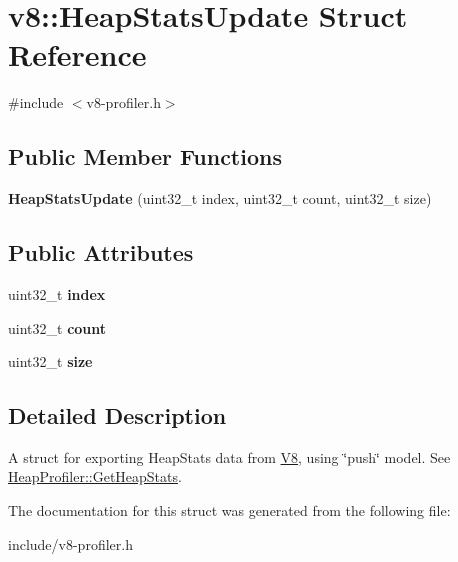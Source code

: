 \hypertarget{structv8_1_1_heap_stats_update}{}\section{v8\+:\+:Heap\+Stats\+Update Struct Reference}
\label{structv8_1_1_heap_stats_update}


{\ttfamily \#include $<$v8-\/profiler.\+h$>$}

\subsection*{Public Member Functions}
\begin{DoxyCompactItemize}
\item 
{\bfseries Heap\+Stats\+Update} (uint32\+\_\+t index, uint32\+\_\+t count, uint32\+\_\+t size)\hypertarget{structv8_1_1_heap_stats_update_aba606181fa7071647cc91a558c450cf3}{}\label{structv8_1_1_heap_stats_update_aba606181fa7071647cc91a558c450cf3}

\end{DoxyCompactItemize}
\subsection*{Public Attributes}
\begin{DoxyCompactItemize}
\item 
uint32\+\_\+t {\bfseries index}\hypertarget{structv8_1_1_heap_stats_update_a90f427acc6e9b8cf2001ca09541545d7}{}\label{structv8_1_1_heap_stats_update_a90f427acc6e9b8cf2001ca09541545d7}

\item 
uint32\+\_\+t {\bfseries count}\hypertarget{structv8_1_1_heap_stats_update_aa74badb1bd196e538b45b971350c33de}{}\label{structv8_1_1_heap_stats_update_aa74badb1bd196e538b45b971350c33de}

\item 
uint32\+\_\+t {\bfseries size}\hypertarget{structv8_1_1_heap_stats_update_a842a199bd372f411f0ae5816e38c45e2}{}\label{structv8_1_1_heap_stats_update_a842a199bd372f411f0ae5816e38c45e2}

\end{DoxyCompactItemize}


\subsection{Detailed Description}
A struct for exporting Heap\+Stats data from \hyperlink{classv8_1_1_v8}{V8}, using \char`\"{}push\char`\"{} model. See \hyperlink{classv8_1_1_heap_profiler_a756d71126e0effc7543fb33e856dd738}{Heap\+Profiler\+::\+Get\+Heap\+Stats}. 

The documentation for this struct was generated from the following file\+:\begin{DoxyCompactItemize}
\item 
include/v8-\/profiler.\+h\end{DoxyCompactItemize}
